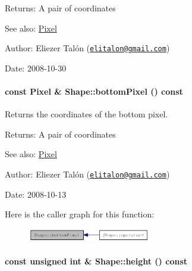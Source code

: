 \begin{Desc}
\item[Returns:]A pair of coordinates\end{Desc}
\begin{Desc}
\item[See also:]\hyperlink{_shape_8hpp_535e59456e3e633842529cfa8ea103c4}{Pixel}\end{Desc}
\begin{Desc}
\item[Author:]Eliezer Talón (\href{mailto:elitalon@gmail.com}{\tt elitalon@gmail.com}) \end{Desc}
\begin{Desc}
\item[Date:]2008-10-30 \end{Desc}
\hypertarget{class_shape_99293804122214fa366d7f7ae794d077}{
\paragraph[{bottomPixel}]{\setlength{\rightskip}{0pt plus 5cm}const {\bf Pixel} \& Shape::bottomPixel () const}\hfill}
\label{class_shape_99293804122214fa366d7f7ae794d077}


Returns the coordinates of the bottom pixel. 

\begin{Desc}
\item[Returns:]A pair of coordinates\end{Desc}
\begin{Desc}
\item[See also:]\hyperlink{_shape_8hpp_535e59456e3e633842529cfa8ea103c4}{Pixel}\end{Desc}
\begin{Desc}
\item[Author:]Eliezer Talón (\href{mailto:elitalon@gmail.com}{\tt elitalon@gmail.com}) \end{Desc}
\begin{Desc}
\item[Date:]2008-10-13 \end{Desc}


Here is the caller graph for this function:\nopagebreak
\begin{figure}[H]
\begin{center}
\leavevmode
\includegraphics[width=152pt]{class_shape_99293804122214fa366d7f7ae794d077_icgraph}
\end{center}
\end{figure}
\hypertarget{class_shape_8400155046b2190bce621f8f366ef2be}{
\paragraph[{height}]{\setlength{\rightskip}{0pt plus 5cm}const unsigned int \& Shape::height () const}\hfill}
\label{class_shape_8400155046b2190bce621f8f366ef2be}


